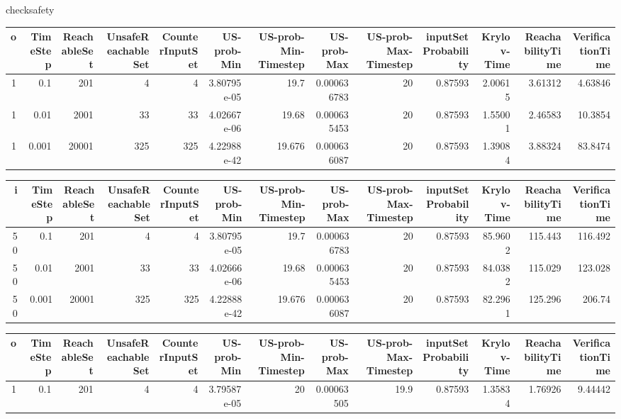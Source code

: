 checksafety
\begin{tabular}{rrrrrrrrrrrrr}
\hline
   o &   TimeStep &   ReachableSet &   UnsafeReachableSet &   CounterInputSet &   US-prob-Min &   US-prob-Min-Timestep &   US-prob-Max &   US-prob-Max-Timestep &   inputSet Probability &   Krylov-Time &   ReachabilityTime &   VerificationTime \\
\hline
   1 &      0.1   &            201 &                    4 &                 4 &   3.80795e-05 &                 19.7   &   0.000636783 &                     20 &                0.87593 &       2.00615 &            3.61312 &            4.63846 \\
   1 &      0.01  &           2001 &                   33 &                33 &   4.02667e-06 &                 19.68  &   0.000635453 &                     20 &                0.87593 &       1.55001 &            2.46583 &           10.3854  \\
   1 &      0.001 &          20001 &                  325 &               325 &   4.22988e-42 &                 19.676 &   0.000636087 &                     20 &                0.87593 &       1.39084 &            3.88324 &           83.8474  \\
\hline
\end{tabular}
\begin{tabular}{rrrrrrrrrrrrr}
\hline
   i &   TimeStep &   ReachableSet &   UnsafeReachableSet &   CounterInputSet &   US-prob-Min &   US-prob-Min-Timestep &   US-prob-Max &   US-prob-Max-Timestep &   inputSet Probability &   Krylov-Time &   ReachabilityTime &   VerificationTime \\
\hline
  50 &      0.1   &            201 &                    4 &                 4 &   3.80795e-05 &                 19.7   &   0.000636783 &                     20 &                0.87593 &       85.9602 &            115.443 &            116.492 \\
  50 &      0.01  &           2001 &                   33 &                33 &   4.02666e-06 &                 19.68  &   0.000635453 &                     20 &                0.87593 &       84.0382 &            115.029 &            123.028 \\
  50 &      0.001 &          20001 &                  325 &               325 &   4.22888e-42 &                 19.676 &   0.000636087 &                     20 &                0.87593 &       82.2961 &            125.296 &            206.74  \\
\hline
\end{tabular}
\begin{tabular}{rrrrrrrrrrrrr}
\hline
   o &   TimeStep &   ReachableSet &   UnsafeReachableSet &   CounterInputSet &   US-prob-Min &   US-prob-Min-Timestep &   US-prob-Max &   US-prob-Max-Timestep &   inputSet Probability &   Krylov-Time &   ReachabilityTime &   VerificationTime \\
\hline
   1 &        0.1 &            201 &                    4 &                 4 &   3.79587e-05 &                     20 &    0.00063505 &                   19.9 &                0.87593 &       1.35834 &            1.76926 &            9.44442 \\
\hline
\end{tabular}
